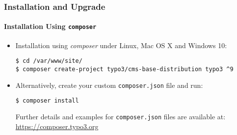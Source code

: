 
\begin{frame}[fragile]
	\frametitle{Installation and Upgrade}
	\framesubtitle{Installation Using \texttt{composer}}

	\begin{itemize}
		\item Installation using \textit{composer} under Linux, Mac OS X and Windows 10:

\begin{lstlisting}
$ cd /var/www/site/
$ composer create-project typo3/cms-base-distribution typo3 ^9
\end{lstlisting}

		\item Alternatively, create your custom \texttt{composer.json} file and run:

\begin{lstlisting}
$ composer install
\end{lstlisting}

			Further details and examples for \texttt{composer.json} files are available at:\newline
			\smaller
				\href{https://composer.typo3.org}{https://composer.typo3.org}
			\normalsize

	\end{itemize}
\end{frame}


